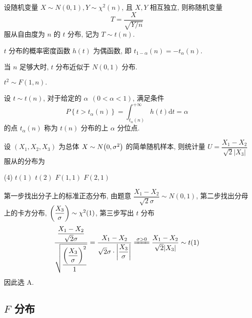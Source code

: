 \begin{definition}[$t$ 分布]
    设随机变量 $ X \sim N(0,1), Y \sim \chi^{2}(n)$, 且 $ X, Y $ 相互独立, 则称随机变量
    $$T=\frac{X}{\sqrt{Y / n}}$$
    服从自由度为 $ n $ 的 $ t $ 分布, 记为 $ T \sim t(n) .$
\end{definition}

\begin{theorem}
    $ t $ 分布的概率密度函数 $ h(t) $ 为偶函数, 即 $ t_{1-\alpha}(n)=-t_{\alpha}(n) .$
\end{theorem}

\begin{theorem}
    当 $ n $ 足够大时, $t $ 分布近似于 $ N(0,1) $ 分布.
\end{theorem}
\begin{theorem}[$t$ 分布与 $F$ 分布]
    $ t^{2} \sim F(1, n) .$
\end{theorem}

\begin{definition}
    设 $ t \sim t(n) $, 对于给定的 $ \alpha~~(0<\alpha<1) $, 满足条件
    $$P\left\{t>t_{\alpha}(n)\right\}=\int_{t_{\alpha}(n)}^{+\infty} h(t) \mathrm{d} t=\alpha$$
    的点 $ t_{\alpha}(n) $ 称为 $ t(n) $ 分布的上 $ \alpha $ 分位点.
\end{definition}

\begin{example}
    设 $(X_1, X_2, X_3)$ 为总体 $X\sim N\qty(0,\sigma^2)$ 的简单随机样本, 则统计量 $U=\dfrac{X_1-X_2}{\sqrt{2}|X_3|}$ 服从的分布为 
    \begin{tasks}(4)
        \task $t(1)$
        \task $t(2)$
        \task $F(1,1)$
        \task $F(2,1)$
    \end{tasks}
\end{example}
\begin{solution}
    第一步找出分子上的标准正态分布, 由题意 $\dfrac{X_1-X_2}{\sqrt{2}\sigma}\sim N(0,1)$,
    第二步找出分母上的卡方分布, $\qty(\dfrac{X_3}{\sigma})\sim \chi^2(1)$,
    第三步写出 $t$ 分布 $$
    \dfrac{\dfrac{X_1-X_2}{\sqrt{2}\sigma}}{\sqrt{\dfrac{\qty(\dfrac{X_3}{\sigma})^2}{1}}}=\dfrac{X_1-X_2}{\sqrt{2}\sigma\cdot\qty|\dfrac{X_3}{\sigma}|}\xlongequal{\sigma>0}\dfrac{X_1-X_2}{\sqrt{2}|X_3|}\sim t(1)
    $$
    因此选 A.
\end{solution}

\subsection{\texorpdfstring{$F$}. 分布}

